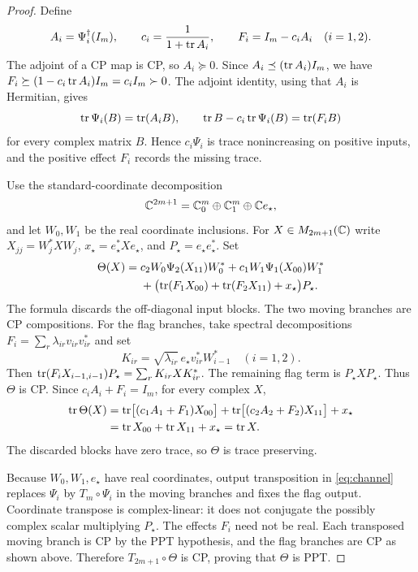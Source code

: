 \begin{proof}
Define
\begin{equation}\label{eq:channel-effects}
 A_i=\Psi_i^\dagger(I_m),\qquad
 c_i=\frac{1}{1+\operatorname{tr} A_i},\qquad
 F_i=I_m-c_iA_i \quad (i=1,2).
\end{equation}
The adjoint of a CP map is CP, so $A_i\succeq0$.  Since
$A_i\preceq(\operatorname{tr} A_i)I_m$, we have
$F_i\succeq(1-c_i\operatorname{tr} A_i)I_m=c_iI_m\succ0$.
The adjoint identity, using that $A_i$ is Hermitian, gives
\[
 \operatorname{tr}\Psi_i(B)=\operatorname{tr}(A_iB),\qquad
 \operatorname{tr} B-c_i\operatorname{tr}\Psi_i(B)=\operatorname{tr}(F_iB)
\]
for every complex matrix $B$.  Hence $c_i\Psi_i$ is trace nonincreasing
on positive inputs, and the positive effect $F_i$ records the missing
trace.

Use the standard-coordinate decomposition
\[
 \mathbb C^{2m+1}=\mathbb C^m_0\oplus\mathbb C^m_1\oplus\mathbb C e_\star,
\]
and let $W_0,W_1$ be the real coordinate inclusions.  For
$X\in M_{2m+1}(\mathbb C)$ write $X_{jj}=W_j^*XW_j$,
$x_\star=e_\star^*Xe_\star$, and $P_\star=e_\star e_\star^*$.  Set
\begin{align}\label{eq:channel}
 \Theta(X)={}&c_2W_0\Psi_2(X_{11})W_0^*
             +c_1W_1\Psi_1(X_{00})W_1^* \notag\\
 &+\bigl(\operatorname{tr}(F_1X_{00})+\operatorname{tr}(F_2X_{11})+x_\star\bigr)P_\star .
\end{align}
The formula discards the off-diagonal input blocks.  The two moving
branches are CP compositions.  For the flag branches, take spectral
decompositions $F_i=\sum_r\lambda_{ir}v_{ir}v_{ir}^*$ and set
\[
 K_{ir}=\sqrt{\lambda_{ir}}\,e_\star v_{ir}^*W_{i-1}^*
       \quad(i=1,2).
\]
Then
$\operatorname{tr}(F_iX_{i-1,i-1})P_\star=\sum_r K_{ir}XK_{ir}^*$.
The remaining flag term is $P_\star XP_\star$.  Thus $\Theta$ is CP.
Since $c_iA_i+F_i=I_m$, for every complex $X$,
\begin{align*}
 \operatorname{tr}\Theta(X)
 &=\operatorname{tr}\bigl[(c_1A_1+F_1)X_{00}\bigr]
   +\operatorname{tr}\bigl[(c_2A_2+F_2)X_{11}\bigr]+x_\star\\
 &=\operatorname{tr} X_{00}+\operatorname{tr} X_{11}+x_\star=\operatorname{tr} X.
\end{align*}
The discarded blocks have zero trace, so $\Theta$ is trace preserving.

Because $W_0,W_1,e_\star$ have real coordinates, output transposition in
\eqref{eq:channel} replaces $\Psi_i$ by $T_m\circ\Psi_i$ in the moving
branches and fixes the flag output.  Coordinate transpose is complex-linear:
it does not conjugate the possibly complex scalar multiplying $P_\star$.
The effects $F_i$ need not be real.  Each transposed moving branch is CP by
the PPT hypothesis, and the flag branches are CP as shown above.  Therefore
$T_{2m+1}\circ\Theta$ is CP, proving that $\Theta$ is PPT.


\end{proof}
